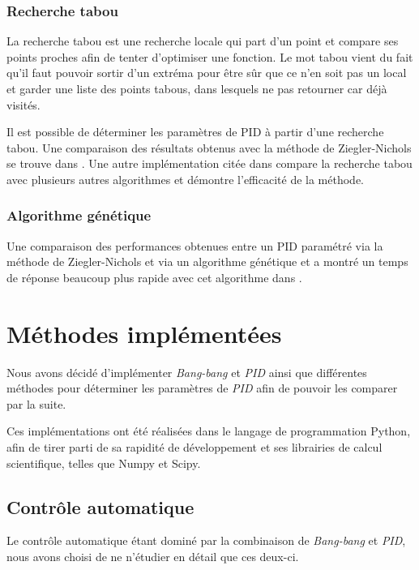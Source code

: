 \documentclass[a4paper,10pt]{report}
\begin{document}

\subsection{Recherche tabou}
La recherche tabou est une recherche locale qui part d'un point et compare ses points proches afin de tenter d'optimiser une fonction.
Le mot tabou vient du fait qu'il faut pouvoir sortir d'un extréma pour être sûr que ce n'en soit pas un local et garder une liste des points tabous, dans lesquels ne pas retourner car déjà visités.

Il est possible de déterminer les paramètres de PID à partir d'une recherche tabou. Une comparaison des résultats obtenus avec la méthode de Ziegler-Nichols se trouve dans \cite{Karaboga569754}. Une autre implémentation citée dans \cite{bagis2011tabu} compare la recherche tabou avec plusieurs autres algorithmes et démontre l'efficacité de la méthode.

\subsection{Algorithme génétique}


Une comparaison des performances obtenues entre un PID paramétré via la méthode de Ziegler-Nichols et via un algorithme génétique et a montré un temps de réponse beaucoup plus rapide avec cet algorithme dans \cite{thomas2009position}.

\chapter{Méthodes implémentées}

Nous avons décidé d'implémenter \textit{Bang-bang} et \textit{PID} ainsi que différentes méthodes pour déterminer les paramètres de \textit{PID} afin de pouvoir les comparer par la suite.

Ces implémentations ont été réalisées dans le langage de programmation Python, afin de tirer parti de sa rapidité de développement et ses librairies de calcul scientifique, telles que Numpy et Scipy.

\section{Contrôle automatique}
Le contrôle automatique étant dominé par la combinaison de \textit{Bang-bang} et \textit{PID}, nous avons choisi de ne n'étudier en détail que ces deux-ci.
\end{document}
